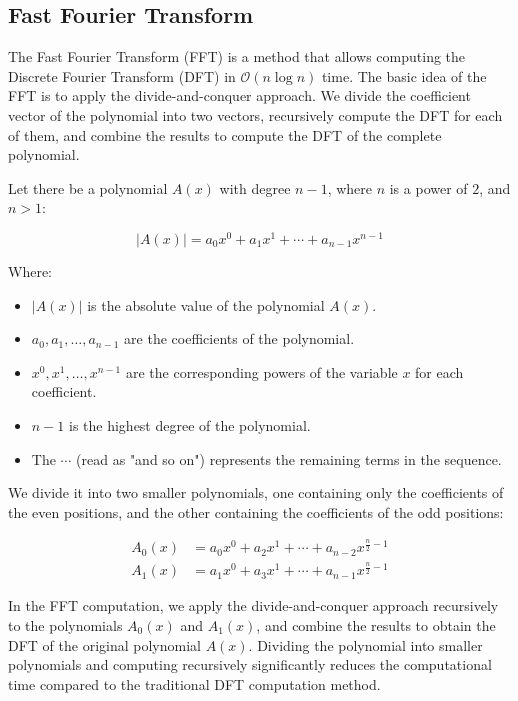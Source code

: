\documentclass{ieeeojies}
\begin{document}
\subsection{Fast Fourier Transform }
The Fast Fourier Transform (FFT) is a method that allows computing the Discrete Fourier Transform (DFT) in $\mathcal{O}(n \log n)$ time. The basic idea of the FFT is to apply the divide-and-conquer approach. We divide the coefficient vector of the polynomial into two vectors, recursively compute the DFT for each of them, and combine the results to compute the DFT of the complete polynomial.

Let there be a polynomial $A(x)$ with degree $n - 1$, where $n$ is a power of $2$, and $n > 1$:

\begin{equation*}
|A(x)| = a_0x^0 + a_1x^1 + \cdots + a_{n-1}x^{n-1}
\end{equation*}

Where:

\begin{itemize}
    \item $|A(x)|$ is the absolute value of the polynomial $A(x)$.
    \item $a_0, a_1, \ldots, a_{n-1}$ are the coefficients of the polynomial.
    \item $x^0, x^1, \ldots, x^{n-1}$ are the corresponding powers of the variable $x$ for each coefficient.
    \item $n - 1$ is the highest degree of the polynomial.
    \item The $\cdots$ (read as "and so on") represents the remaining terms in the sequence.
\end{itemize}

We divide it into two smaller polynomials, one containing only the coefficients of the even positions, and the other containing the coefficients of the odd positions:

\begin{align*}
A_0(x) &= a_0x^0 + a_2x^1 + \cdots + a_{n-2}x^{\frac{n}{2}-1}\\
A_1(x) &= a_1x^0 + a_3x^1 + \cdots + a_{n-1}x^{\frac{n}{2}-1}
\end{align*}

In the FFT computation, we apply the divide-and-conquer approach recursively to the polynomials $A_0(x)$ and $A_1(x)$, and combine the results to obtain the DFT of the original polynomial $A(x)$. Dividing the polynomial into smaller polynomials and computing recursively significantly reduces the computational time compared to the traditional DFT computation method.
\end{document}
